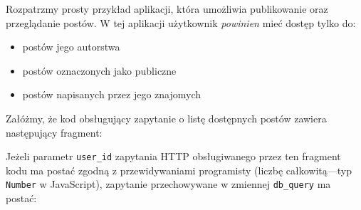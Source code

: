 \documentclass[12pt,polish,a4paper,]{report}
\newenvironment{Shaded}{}{}
\newcommand{\KeywordTok}[1]{\textcolor[rgb]{0.00,0.44,0.13}{\textbf{{#1}}}}
\newcommand{\DataTypeTok}[1]{\textcolor[rgb]{0.56,0.13,0.00}{{#1}}}
\newcommand{\DecValTok}[1]{\textcolor[rgb]{0.25,0.63,0.44}{{#1}}}
\newcommand{\StringTok}[1]{\textcolor[rgb]{0.25,0.44,0.63}{{#1}}}
\newcommand{\CommentTok}[1]{\textcolor[rgb]{0.38,0.63,0.69}{\textit{{#1}}}}
\newcommand{\OtherTok}[1]{\textcolor[rgb]{0.00,0.44,0.13}{{#1}}}
\newcommand{\FunctionTok}[1]{\textcolor[rgb]{0.02,0.16,0.49}{{#1}}}
\newcommand{\VariableTok}[1]{\textcolor[rgb]{0.10,0.09,0.49}{{#1}}}
\newcommand{\ControlFlowTok}[1]{\textcolor[rgb]{0.00,0.44,0.13}{\textbf{{#1}}}}
\newcommand{\OperatorTok}[1]{\textcolor[rgb]{0.40,0.40,0.40}{{#1}}}
\newcommand{\AttributeTok}[1]{\textcolor[rgb]{0.49,0.56,0.16}{{#1}}}
\newcommand{\NormalTok}[1]{{#1}}
\providecommand{\tightlist}{%
  \setlength{\itemsep}{0pt}\setlength{\parskip}{0pt}}
\begin{document}
Rozpatrzmy prosty przykład aplikacji, która umożliwia publikowanie oraz
przeglądanie postów. W tej aplikacji użytkownik \emph{powinien} mieć
dostęp tylko do:

\begin{itemize}
\tightlist
\item
  postów jego autorstwa
\item
  postów oznaczonych jako publiczne
\item
  postów napisanych przez jego znajomych
\end{itemize}

Załóżmy, że kod obsługujący zapytanie o listę dostępnych postów zawiera
następujący fragment:

\begin{Shaded}
\end{Shaded}

Jeżeli parametr \texttt{user\_id} zapytania HTTP obsługiwanego przez ten
fragment kodu ma postać zgodną z przewidywaniami programisty (liczbę
całkowitą---typ \texttt{Number} w JavaScript), zapytanie przechowywane w
zmiennej \texttt{db\_query} ma postać:

\begin{Shaded}
\end{Shaded}
\end{document}
